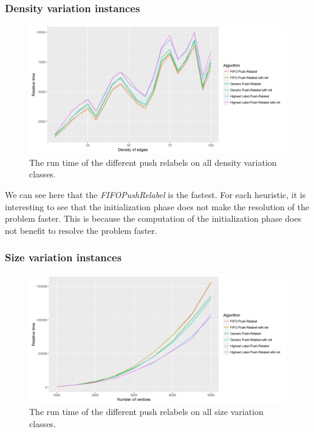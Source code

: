 \subsubsection{Density variation instances}
\begin{figure}[H]
\begin{center}
\includegraphics[scale=0.65]{images/meandensitypr.png}
\caption{The run time of the different push relabels on all density variation classes.}
\label{fig:mean_density_pr}
\end{center}
\end{figure}

We can see here that the \textit{FIFOPushRelabel} is the fastest. For each heuristic, it is interesting to see that the initialization phase does not make the resolution of the problem faster. This is because the computation of the initialization phase does not benefit to resolve the problem faster. 


\subsubsection{Size variation instances}
\begin{figure}[H]
\begin{center}
\includegraphics[scale=0.54]{images/meansizepr.png}
\caption{The run time of the different push relabels on all size variation classes.}
\label{fig:mean_size_pr}
\end{center}
\end{figure}

